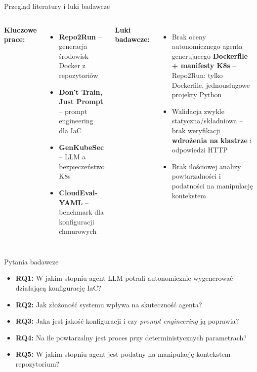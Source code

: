 \documentclass[aspectratio=169]{beamer}
\begin{document}
\begin{frame}{Przegląd literatury i luki badawcze}
    \begin{columns}[T]
        \textbf{Kluczowe prace:}
        \begin{itemize}
            \item \textbf{Repo2Run} \parencite{hu_llm-based_2025} -- generacja środowisk Docker z repozytoriów
            \item \textbf{Don't Train, Just Prompt} \parencite{kratzke_dont_2024} -- prompt engineering dla IaC
            \item \textbf{GenKubeSec} \parencite{malul_genkubesec_2024} -- LLM a bezpieczeństwo K8s
            \item \textbf{CloudEval-YAML} \parencite{xu_cloudeval-yaml_2023} -- benchmark dla konfiguracji chmurowych
        \end{itemize}
        \textbf{Luki badawcze:}
        \begin{itemize}
            \item Brak oceny autonomicznego agenta generującego \textbf{Dockerfile + manifesty K8s} -- Repo2Run: tylko Dockerfile, jednousługowe projekty Python
            \item Walidacja zwykle statyczna/składniowa -- brak weryfikacji \textbf{wdrożenia na klastrze} i odpowiedzi HTTP
            \item Brak ilościowej analizy powtarzalności i podatności na manipulację kontekstem
        \end{itemize}
    \end{columns}
\end{frame}

\begin{frame}{Pytania badawcze}
    \begin{itemize}
        \setlength{\itemsep}{0.6em}
        \item \textbf{RQ1:} W jakim stopniu agent LLM potrafi autonomicznie wygenerować działającą konfigurację IaC?
        \item \textbf{RQ2:} Jak złożoność systemu wpływa na skuteczność agenta?
        \item \textbf{RQ3:} Jaka jest jakość konfiguracji i czy \textit{prompt engineering} ją poprawia?
        \item \textbf{RQ4:} Na ile powtarzalny jest proces przy deterministycznych parametrach?
        \item \textbf{RQ5:} W jakim stopniu agent jest podatny na manipulację kontekstem repozytorium?
    \end{itemize}
\end{frame}
\end{document}
